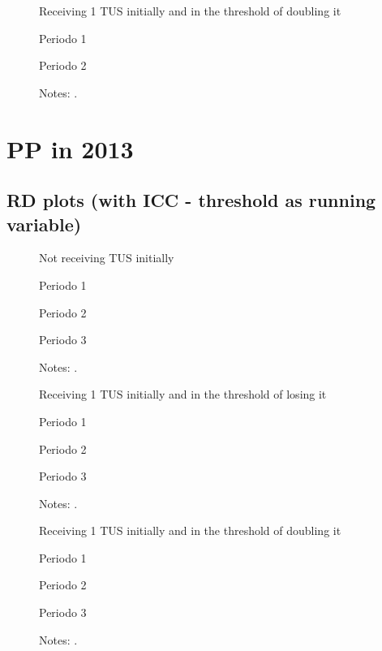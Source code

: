 \documentclass[12pt]{article}
\begin{document}
\begin{figure}[H]%
	\caption{Receiving 1 TUS initially and in the threshold of doubling it}%
	\centering
	\caption*{ {Periodo 1}}
	\qquad
	\caption*{Periodo 2}
	\label{fig:pp2016_seg_2TUS.pdf}%
	\caption*{ {\footnotesize Notes: .}}
\end{figure}


\section{PP in 2013}

\subsection{RD plots (with ICC - threshold as running variable)}
\begin{figure}[H]%
	\caption{Not receiving TUS initially}%
	\centering
	\caption*{ {Periodo 1}}
	\caption*{Periodo 2}
	\qquad
	\caption*{Periodo 3}
	\label{fig:pp2013_prim_0TUS.png}%
	\caption*{ {\footnotesize Notes: .}}
\end{figure}

\begin{figure}[H]%
	\caption{Receiving 1 TUS initially and in the threshold of losing it}%
	\centering
	\caption*{ {Periodo 1}}
	\qquad
	\caption*{Periodo 2}
	\qquad
	\caption*{Periodo 3}
	\label{fig:pp2013_prim_1TUS.png}%
	\caption*{ {\footnotesize Notes: .}}
\end{figure}

\begin{figure}[H]%
	\caption{Receiving 1 TUS initially and in the threshold of doubling it}%
	\centering
	\caption*{ {Periodo 1}}
	\qquad
	\caption*{Periodo 2}
	\qquad
	\caption*{Periodo 3}
	\label{fig:pp2013_seg_1TUS.png}%
	\caption*{ {\footnotesize Notes: .}}
\end{figure}
\end{document}
